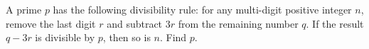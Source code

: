 A prime $p$ has the following divisibility rule: for any multi-digit positive integer $n$, remove the last digit $r$ and subtract $3r$ from the remaining number $q$. If the result $q-3r$ is divisible by $p$, then so is $n$. Find $p$.

